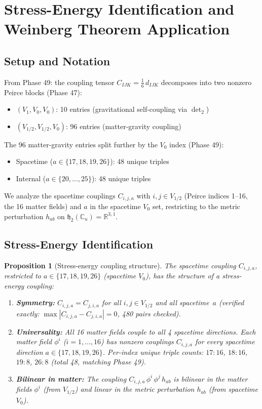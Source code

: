 \documentclass[11pt]{article}
\newtheorem{proposition}{Proposition}
\newcommand{\h}{\mathfrak{h}}
\begin{document}
\section{Stress-Energy Identification and Weinberg Theorem Application}

\subsection{Setup and Notation}

From Phase 49: the coupling tensor $C_{IJK} = \frac{1}{6}\, d_{IJK}$ decomposes
into two nonzero Peirce blocks (Phase 47):
\begin{itemize}
\item $(V_1, V_0, V_0)$: 10 entries (gravitational self-coupling via $\det_2$)
\item $(V_{1/2}, V_{1/2}, V_0)$: 96 entries (matter-gravity coupling)
\end{itemize}
The 96 matter-gravity entries split further by the $V_0$ index (Phase 49):
\begin{itemize}
\item Spacetime ($a \in \{17,18,19,26\}$): 48 unique triples
\item Internal ($a \in \{20,\ldots,25\}$): 48 unique triples
\end{itemize}
We analyze the spacetime couplings $C_{i,j,a}$ with $i,j \in V_{1/2}$
(Peirce indices 1--16, the 16 matter fields) and $a$ in the spacetime
$V_0$ set, restricting to the metric perturbation $h_{ab}$ on
$\h_2(\mathbb{C}_u) = \mathbb{R}^{3,1}$.

\subsection{Stress-Energy Identification}

\begin{proposition}[Stress-energy coupling structure]\label{prop:stress-energy}
The spacetime coupling $C_{i,j,a}$, restricted to $a \in \{17,18,19,26\}$
(spacetime $V_0$), has the structure of a stress-energy coupling:
\begin{enumerate}
\item \textbf{Symmetry:} $C_{i,j,a} = C_{j,i,a}$ for all
  $i,j \in V_{1/2}$ and all spacetime~$a$
  (verified exactly: $\max |C_{i,j,a} - C_{j,i,a}| = 0$, 480 pairs checked).
\item \textbf{Universality:} All 16 matter fields couple to all 4
  spacetime directions. Each matter field $\phi^i$ ($i = 1,\ldots,16$)
  has nonzero couplings $C_{i,j,a}$ for \emph{every} spacetime
  direction $a \in \{17,18,19,26\}$.
  Per-index unique triple counts: $17{:}16$, $18{:}16$, $19{:}8$, $26{:}8$
  (total 48, matching Phase 49).
\item \textbf{Bilinear in matter:} The coupling $C_{i,j,a}\,\phi^i\,\phi^j\,h_{ab}$
  is bilinear in the matter fields $\phi^i$ (from $V_{1/2}$) and linear
  in the metric perturbation $h_{ab}$ (from spacetime $V_0$).
\end{enumerate}
\end{proposition}
\end{document}
